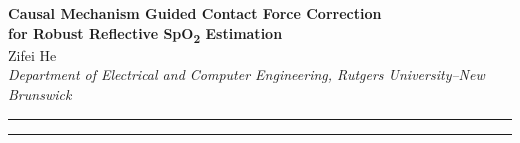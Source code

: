 \documentclass[10pt]{article}
\begin{document}
\begin{center}
{\Large\textbf{Causal Mechanism Guided Contact Force Correction\\for Robust Reflective SpO\textsubscript{2} Estimation}}\\
\vspace{1em}
{\large Zifei He}\\
\vspace{1em}
\textit{Department of Electrical and Computer Engineering, Rutgers University--New Brunswick}
\end{center}
\begin{center}\rule{150mm}{0.2mm}\end{center}
\begin{abstract}
Contact force changes reflective photoplethysmography (PPG) and can bias estimates of peripheral oxygen saturation (SpO$_2$). Building on previous experiments and collected data, this project will develop a model that corrects the dual-wavelength ratio according to the known measurement mechanism. Tests on unseen subjects and force conditions will compare this approach with direct feature fusion. Separate checks of input quality and model applicability will determine whether to report an estimate or request a new measurement. Reproducible CPU experiments will evaluate both estimation accuracy and responses to sensor failures.
\end{abstract}
\begin{center}\rule{150mm}{0.2mm}\end{center}
\vspace{5mm}
\end{document}
